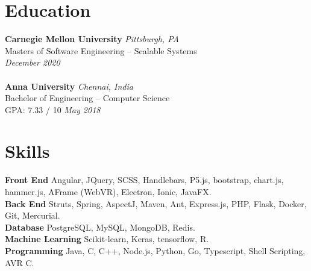 \documentclass{resume}
\author{https://aravindvasu.dev}{Aravind Vasudevan}
\begin{document}
\begin{multicols*}{2}
[
\maketitle
]
\section*{Education}
\noindent
\textbf{Carnegie Mellon University} \hfill \textit{Pittsburgh, PA} \\
{\small Masters of Software Engineering -- Scalable Systems}  \\
\null\hfill \textit{\small December 2020} \\
\\
\textbf{Anna University} \hfill \textit{Chennai, India} \\
{\small Bachelor of Engineering -- Computer Science}  \\
{\small GPA: 7.33 / 10} \hfill \textit{\small May 2018}


\section*{Skills}
\noindent
\textbf{Front End} Angular, JQuery, SCSS, Handlebars, P5.js, bootstrap, chart.js, hammer.js, AFrame (WebVR), Electron, Ionic, JavaFX. \\
\textbf{Back End} Struts, Spring, AspectJ, Maven, Ant, Express.js, PHP, Flask, Docker, Git, Mercurial. \\
\textbf{Database} PostgreSQL, MySQL, MongoDB, Redis. \\
\textbf{Machine Learning} Scikit-learn, Keras, tensorflow, R. \\
\textbf{Programming} Java, C, C++, Node.js, Python, Go, Typescript, Shell Scripting, AVR C.


\end{multicols*}
\end{document}
